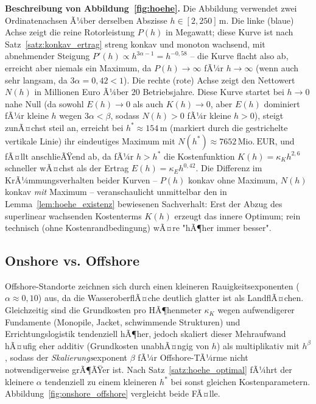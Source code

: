 ﻿\documentclass[a4paper,12pt]{article}
\theoremstyle{definition}
\begin{document}
\textbf{Beschreibung von Abbildung~\ref{fig:hoehe}.}
Die Abbildung verwendet zwei Ordinatenachsen Ã¼ber derselben Abszisse $h\in[2,250]\,\mathrm{m}$. Die linke (blaue) Achse zeigt die reine Rotorleistung $P(h)$ in Megawatt; diese Kurve ist nach Satz~\ref{satz:konkav_ertrag} streng konkav und monoton wachsend, mit abnehmender Steigung $P'(h)\propto h^{3\alpha-1}=h^{-0{,}58}$ -- die Kurve flacht also ab, erreicht aber niemals ein Maximum, da $P(h)\to\infty$ fÃ¼r $h\to\infty$ (wenn auch sehr langsam, da $3\alpha=0{,}42<1$). Die rechte (rote) Achse zeigt den Nettowert $N(h)$ in Millionen Euro Ã¼ber $20$ Betriebsjahre. Diese Kurve startet bei $h\to0$ nahe Null (da sowohl $E(h)\to0$ als auch $K(h)\to0$, aber $E(h)$ dominiert fÃ¼r kleine $h$ wegen $3\alpha<\beta$, sodass $N(h)>0$ fÃ¼r kleine $h>0$), steigt zunÃ¤chst steil an, erreicht bei $h^*\approx154\,\mathrm{m}$ (markiert durch die gestrichelte vertikale Linie) ihr eindeutiges Maximum mit $N(h^*)\approx7652\,\mathrm{Mio.\ EUR}$, und fÃ¤llt anschlieÃŸend ab, da fÃ¼r $h>h^*$ die Kostenfunktion $K(h)=\kappa_K h^{2{,}6}$ schneller wÃ¤chst als der Ertrag $E(h)=\kappa_E h^{0{,}42}$. Die Differenz im KrÃ¼mmungsverhalten beider Kurven -- $P(h)$ konkav ohne Maximum, $N(h)$ konkav \emph{mit} Maximum -- veranschaulicht unmittelbar den in Lemma~\ref{lem:hoehe_existenz} bewiesenen Sachverhalt: Erst der Abzug des superlinear wachsenden Kostenterms $K(h)$ erzeugt das innere Optimum; rein technisch (ohne Kostenrandbedingung) wÃ¤re "hÃ¶her immer besser".

\subsection{Onshore vs. Offshore}

Offshore-Standorte zeichnen sich durch einen kleineren Rauigkeitsexponenten ($\alpha\approx0{,}10$) aus, da die WasseroberflÃ¤che deutlich glatter ist als LandflÃ¤chen. Gleichzeitig sind die Grundkosten pro HÃ¶henmeter $\kappa_K$ wegen aufwendigerer Fundamente (Monopile, Jacket, schwimmende Strukturen) und Errichtungslogistik tendenziell hÃ¶her, jedoch skaliert dieser Mehraufwand hÃ¤ufig eher additiv (Grundkosten unabhÃ¤ngig von $h$) als multiplikativ mit $h^\beta$, sodass der \emph{Skalierungs}exponent $\beta$ fÃ¼r Offshore-TÃ¼rme nicht notwendigerweise grÃ¶ÃŸer ist. Nach Satz~\ref{satz:hoehe_optimal} fÃ¼hrt der kleinere $\alpha$ tendenziell zu einem kleineren $h^*$ bei sonst gleichen Kostenparametern. Abbildung~\ref{fig:onshore_offshore} vergleicht beide FÃ¤lle.
\end{document}
